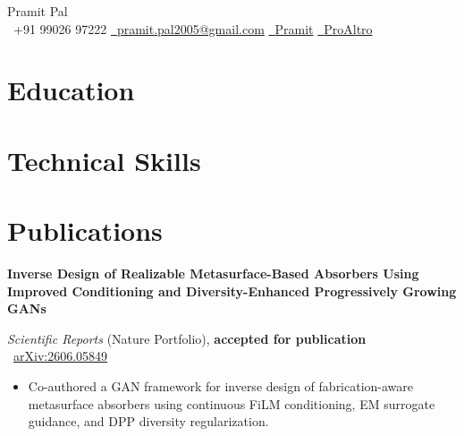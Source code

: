 \documentclass[a4paper, 11px]{article}
\makeatletter
\newcommand{\name}{Pramit Pal}
\newcommand{\phone}{+91 99026 97222}
\newcommand{\emailPersonal}{pramit.pal2005@gmail.com}
\newcommand{\GitHub}{https://github.com/ProAltro}
\makeatother
\begin{document}
\begin{center}
    {\huge \name}\\
    \vspace{5pt}
    \small \raisebox{0.0\height}{\small \faPhone}\ {\phone}
    \hspace{2mm} 
    \href{mailto: \emailPersonal}{\raisebox{0.0\height}{\small \faEnvelope}\ {\emailPersonal}}
    \hspace{2mm} 
    \href{https://www.linkedin.com/in/pramit-p-8404a4264/}{\raisebox{0.0\height}{\footnotesize \faLinkedin}\ {Pramit}} 
    \hspace{2mm} \href{\GitHub}{\raisebox{0.0\height}{\footnotesize \faGithub}\ {ProAltro}}
\end{center}
\section{Education}
\resumeSubHeadingListStart
{}
\resumeSubHeadingListEnd
\section{Technical Skills}
\resumeSkillsListStart
\resumeSkillsListEnd
\section{Publications}
\resumeSubHeadingListStart
\item {\small\raggedright
    \textbf{Inverse Design of Realizable Metasurface-Based Absorbers Using Improved Conditioning and Diversity-Enhanced Progressively Growing GANs}\par
    \textit{Scientific Reports} (Nature Portfolio), \textbf{accepted for publication} \textbar\ \href{https://arxiv.org/abs/2606.05849}{arXiv:2606.05849}
    \begin{itemize}
        \item Co-authored a GAN framework for inverse design of fabrication-aware metasurface absorbers using continuous FiLM conditioning, EM surrogate guidance, and DPP diversity regularization.
    \end{itemize}
}
\resumeSubHeadingListEnd
\end{document}
